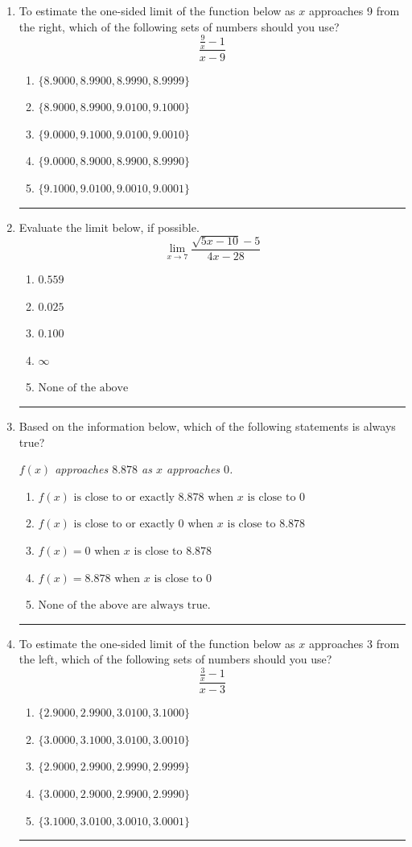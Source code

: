 \documentclass[14pt]{extbook}
\newcommand{\litem}[1]{\item#1\hspace*{-1cm}\rule{\textwidth}{0.4pt}}
\begin{document}
\begin{enumerate}
{\begin{enumerate}[label=\Alph*.]
\end{enumerate} }
\litem{
To estimate the one-sided limit of the function below as $x$ approaches 9 from the right, which of the following sets of numbers should you use?\[ \frac{\frac{9}{x} - 1}{x - 9} \]\begin{enumerate}[label=\Alph*.]
\item \( \{ 8.9000, 8.9900, 8.9990, 8.9999 \} \)
\item \( \{ 8.9000, 8.9900, 9.0100, 9.1000 \} \)
\item \( \{ 9.0000, 9.1000, 9.0100, 9.0010 \} \)
\item \( \{ 9.0000, 8.9000, 8.9900, 8.9990 \} \)
\item \( \{ 9.1000, 9.0100, 9.0010, 9.0001 \} \)

\end{enumerate} }
\litem{
Evaluate the limit below, if possible.\[ \lim_{x \rightarrow 7} \frac{\sqrt{5x - 10} - 5}{4x - 28} \]\begin{enumerate}[label=\Alph*.]
\item \( 0.559 \)
\item \( 0.025 \)
\item \( 0.100 \)
\item \( \infty \)
\item \( \text{None of the above} \)

\end{enumerate} }
\litem{
Based on the information below, which of the following statements is always true?
\begin{center}
    \textit{ $f(x)$ approaches $8.878$ as $x$ approaches $0$. }
\end{center}
\begin{enumerate}[label=\Alph*.]
\item \( f(x) \text{ is close to or exactly } 8.878 \text{ when } x \text{ is close to } 0 \)
\item \( f(x) \text{ is close to or exactly } 0 \text{ when } x \text{ is close to } 8.878 \)
\item \( f(x) = 0 \text{ when } x \text{ is close to } 8.878 \)
\item \( f(x) = 8.878 \text{ when } x \text{ is close to } 0 \)
\item \( \text{None of the above are always true.} \)

\end{enumerate} }
\litem{
To estimate the one-sided limit of the function below as $x$ approaches 3 from the left, which of the following sets of numbers should you use?\[ \frac{\frac{3}{x} - 1}{x - 3} \]\begin{enumerate}[label=\Alph*.]
\item \( \{ 2.9000, 2.9900, 3.0100, 3.1000 \} \)
\item \( \{ 3.0000, 3.1000, 3.0100, 3.0010 \} \)
\item \( \{ 2.9000, 2.9900, 2.9990, 2.9999 \} \)
\item \( \{ 3.0000, 2.9000, 2.9900, 2.9990 \} \)
\item \( \{ 3.1000, 3.0100, 3.0010, 3.0001 \} \)


\end{enumerate}}
\end{enumerate}
\end{document}
